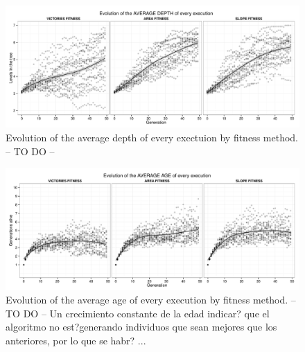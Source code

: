 \documentclass[preprint]{elsarticle}
\begin{document}
 \begin{figure}[ht]
 \begin{center}
   \includegraphics[width=12cm]{nuevas_imgs/evolution_AVERAGE_DEPTH.pdf}
 \end{center}
 \caption{Evolution of the average depth of every exectuion by fitness
   method. -- TO DO --} %
 \label{figura:evolutionDEPTH}
 \end{figure}

 \begin{figure}[ht]
 \begin{center}
   \includegraphics[width=12cm]{nuevas_imgs/evolution_AVERAGE_AGE.pdf}
 \end{center}
 \caption{Evolution of the average age of every execution by fitness
   method. -- TO DO -- Un crecimiento constante de la edad indicar?
   que el algoritmo no est?generando individuos que sean mejores que
   los anteriores, por lo que se habr? ...} %
 \label{figura:evolutionAGE}
 \end{figure}

\begin{table}
\end{table}
\end{document}
